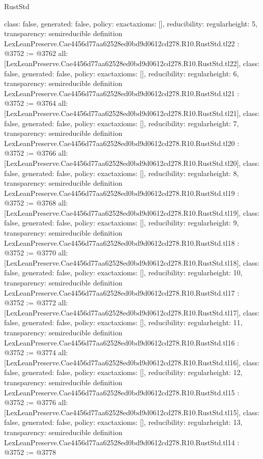 \begin{lexlean}{RustStd}
\begin{coremodule}
{  class: false,
  generated: false,
  policy: exact{axioms: []},
  reducibility: regular{height: 5},
  transparency: semireducible
}
definition LexLeanPreserve.Cae4456d77aa62528ed0bd9d0612cd278.R10.RustStd.tl22 : @3752 := @3762 {
  all: [LexLeanPreserve.Cae4456d77aa62528ed0bd9d0612cd278.R10.RustStd.tl22],
  class: false,
  generated: false,
  policy: exact{axioms: []},
  reducibility: regular{height: 6},
  transparency: semireducible
}
definition LexLeanPreserve.Cae4456d77aa62528ed0bd9d0612cd278.R10.RustStd.tl21 : @3752 := @3764 {
  all: [LexLeanPreserve.Cae4456d77aa62528ed0bd9d0612cd278.R10.RustStd.tl21],
  class: false,
  generated: false,
  policy: exact{axioms: []},
  reducibility: regular{height: 7},
  transparency: semireducible
}
definition LexLeanPreserve.Cae4456d77aa62528ed0bd9d0612cd278.R10.RustStd.tl20 : @3752 := @3766 {
  all: [LexLeanPreserve.Cae4456d77aa62528ed0bd9d0612cd278.R10.RustStd.tl20],
  class: false,
  generated: false,
  policy: exact{axioms: []},
  reducibility: regular{height: 8},
  transparency: semireducible
}
definition LexLeanPreserve.Cae4456d77aa62528ed0bd9d0612cd278.R10.RustStd.tl19 : @3752 := @3768 {
  all: [LexLeanPreserve.Cae4456d77aa62528ed0bd9d0612cd278.R10.RustStd.tl19],
  class: false,
  generated: false,
  policy: exact{axioms: []},
  reducibility: regular{height: 9},
  transparency: semireducible
}
definition LexLeanPreserve.Cae4456d77aa62528ed0bd9d0612cd278.R10.RustStd.tl18 : @3752 := @3770 {
  all: [LexLeanPreserve.Cae4456d77aa62528ed0bd9d0612cd278.R10.RustStd.tl18],
  class: false,
  generated: false,
  policy: exact{axioms: []},
  reducibility: regular{height: 10},
  transparency: semireducible
}
definition LexLeanPreserve.Cae4456d77aa62528ed0bd9d0612cd278.R10.RustStd.tl17 : @3752 := @3772 {
  all: [LexLeanPreserve.Cae4456d77aa62528ed0bd9d0612cd278.R10.RustStd.tl17],
  class: false,
  generated: false,
  policy: exact{axioms: []},
  reducibility: regular{height: 11},
  transparency: semireducible
}
definition LexLeanPreserve.Cae4456d77aa62528ed0bd9d0612cd278.R10.RustStd.tl16 : @3752 := @3774 {
  all: [LexLeanPreserve.Cae4456d77aa62528ed0bd9d0612cd278.R10.RustStd.tl16],
  class: false,
  generated: false,
  policy: exact{axioms: []},
  reducibility: regular{height: 12},
  transparency: semireducible
}
definition LexLeanPreserve.Cae4456d77aa62528ed0bd9d0612cd278.R10.RustStd.tl15 : @3752 := @3776 {
  all: [LexLeanPreserve.Cae4456d77aa62528ed0bd9d0612cd278.R10.RustStd.tl15],
  class: false,
  generated: false,
  policy: exact{axioms: []},
  reducibility: regular{height: 13},
  transparency: semireducible
}
definition LexLeanPreserve.Cae4456d77aa62528ed0bd9d0612cd278.R10.RustStd.tl14 : @3752 := @3778 {
}
\end{coremodule}
\end{lexlean}

